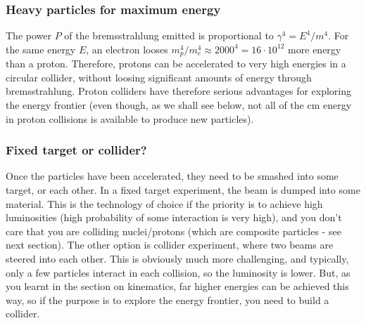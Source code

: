 \subsubsection{Heavy particles for maximum energy}
The power $P$ of the bremsstrahlung emitted is proportional to $\gamma^4 = E^4/m^4$. For the same energy $E$, an electron looses $m_p^4/m_e^4 \approx 2000^4 = 16\cdot 10^{12}$ more energy than a proton. Therefore, protons can be accelerated to very high energies in a circular collider, without loosing significant amounts of energy through bremsstrahlung.
Proton colliders have therefore serious advantages for exploring the energy frontier (even though, as we shall see below, not all of the cm energy in proton collisions is available to produce new particles).

\subsubsection{Fixed target or collider? }
Once the particles have been accelerated, they need to be smashed into some target, or each other. In a fixed target experiment, the beam is dumped into some material. This is the technology of choice if the priority is to achieve high luminosities (high probability of some interaction is very high), and you don't care that you are colliding nuclei/protons (which are composite particles - see next section). The other option is collider experiment, where two beams are steered into each other. This is obviously much more challenging, and typically, only a few particles interact in each collision, so the luminosity is lower. But, as you learnt in the section on kinematics, far higher energies can be achieved this way, so if the purpose is to explore the energy frontier, you need to build a collider.

